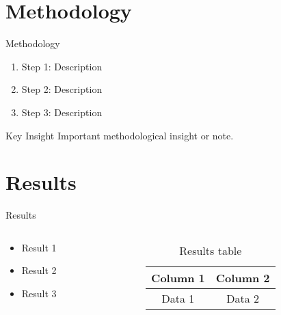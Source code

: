 \documentclass[aspectratio=169]{beamer}
\begin{document}
\section{Methodology}
\begin{frame}{Methodology}
    \begin{enumerate}
        \item<1-> Step 1: Description
        \item<2-> Step 2: Description
        \item<3-> Step 3: Description
    \end{enumerate}
    
    \begin{block}{Key Insight}
        Important methodological insight or note.
    \end{block}
\end{frame}

\section{Results}
\begin{frame}{Results}
    \begin{columns}
        \begin{column}{0.5\textwidth}
            \begin{itemize}
                \item Result 1
                \item Result 2
                \item Result 3
            \end{itemize}
        \end{column}
        \begin{column}{0.5\textwidth}
            \begin{table}
                \centering
                \begin{tabular}{|c|c|}
                    \hline
                    Column 1 & Column 2 \\
                    \hline
                    Data 1 & Data 2 \\
                    \hline
                \end{tabular}
                \caption{Results table}
            \end{table}
        \end{column}
    \end{columns}
\end{frame}
\end{document}
